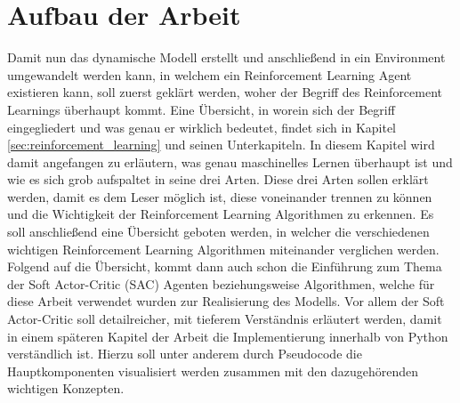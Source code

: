 \documentclass[]{iat}
\begin{document}
\section{Aufbau der Arbeit} \label{sec:aufbau_arbeit}
Damit nun das dynamische Modell erstellt und anschließend in ein Environment umgewandelt werden kann, in welchem ein Reinforcement Learning Agent existieren kann, soll zuerst geklärt werden, woher der Begriff des Reinforcement Learnings überhaupt kommt. Eine Übersicht, in worein sich der Begriff eingegliedert und was genau er wirklich bedeutet, findet sich in Kapitel \ref{sec:reinforcement_learning} und seinen Unterkapiteln. In diesem Kapitel wird damit angefangen zu erläutern, was genau maschinelles Lernen überhaupt ist und wie es sich grob aufspaltet in seine drei Arten. Diese drei Arten sollen erklärt werden, damit es dem Leser möglich ist, diese voneinander trennen zu können und die Wichtigkeit der Reinforcement Learning Algorithmen zu erkennen. Es soll anschließend eine Übersicht geboten werden, in welcher die verschiedenen wichtigen Reinforcement Learning Algorithmen miteinander verglichen werden. Folgend auf die Übersicht, kommt dann auch schon die Einführung zum Thema der Soft Actor-Critic (SAC) \cite[]{sac} Agenten beziehungsweise Algorithmen, welche für diese Arbeit verwendet wurden zur Realisierung des Modells. Vor allem der Soft Actor-Critic soll detailreicher, mit tieferem Verständnis erläutert werden, damit in einem späteren Kapitel der Arbeit die Implementierung innerhalb von Python verständlich ist. Hierzu soll unter anderem durch Pseudocode die Hauptkomponenten visualisiert werden zusammen mit den dazugehörenden wichtigen Konzepten.\\
\end{document}
